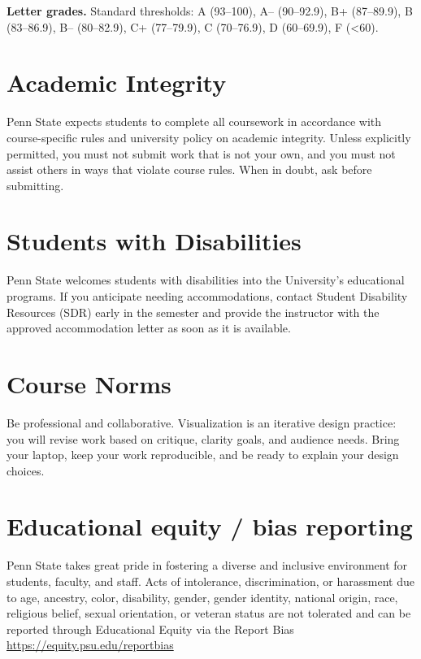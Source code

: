 \documentclass[letterpaper,11pt]{article}
\begin{document}
\noindent \textbf{Letter grades.} Standard thresholds: A (93--100), A-- (90--92.9), B+ (87--89.9), B (83--86.9), B-- (80--82.9), C+ (77--79.9), C (70--76.9), D (60--69.9), F (<60).

\section*{Academic Integrity}
Penn State expects students to complete all coursework in accordance with course-specific rules and university policy on academic integrity. Unless explicitly permitted, you must not submit work that is not your own, and you must not assist others in ways that violate course rules. When in doubt, ask before submitting.

\section*{Students with Disabilities}
Penn State welcomes students with disabilities into the University's educational programs. If you anticipate needing accommodations, contact Student Disability Resources (SDR) early in the semester and provide the instructor with the approved accommodation letter as soon as it is available.

\section*{Course Norms}
Be professional and collaborative. Visualization is an iterative design practice: you will revise work based on critique, clarity goals, and audience needs. Bring your laptop, keep your work reproducible, and be ready to explain your design choices.


\section*{Educational equity / bias reporting}

Penn State takes great pride in fostering a diverse and inclusive environment for students, faculty, and staff. Acts of intolerance, discrimination, or harassment due to age, ancestry, color, disability, gender, gender identity, national origin, race, religious belief, sexual orientation, or veteran status are not tolerated and can be reported through Educational Equity via the Report Bias \url{https://equity.psu.edu/reportbias}
\end{document}
